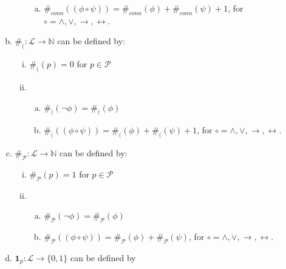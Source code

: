 \begin{enumerate}
\begin{enumerate}[(a)]
\begin{enumerate}[(i)]
\begin{enumerate}[(a)]
					\item $\#_{conn}((\phi\circ\psi))=\#_{conn}(\phi)+\#_{conn}(\psi)+1$, for $\circ=\land,\lor,\to,\leftrightarrow$.
		
					\end{enumerate}
		
			\end{enumerate}
		
		\item $\#_(:\mathcal{L}\to\mathbb{N}$ can be defined by:
	
			\begin{enumerate}[(i)]
		
				\item $\#_{(}(p)=0$ for $p\in\mathcal{P}$
		
				\item \begin{enumerate}[(a)]
		
						\item $\#_{(}(\neg\phi)=\#_{(}(\phi)$
			
						\item $\#_{(}((\phi\circ\psi))=\#_{(}(\phi)+\#_{(}(\psi)+1$, for $\circ=\land,\lor,\to,\leftrightarrow$.
		
					\end{enumerate}
				
			\end{enumerate}
		
	\item  $\#_{\mathcal{P}}:\mathcal{L}\to\mathbb{N}$ can be defined by:
		
		\begin{enumerate}[(i)]
	
		\item $\#_{\mathcal{P}}(p)=1$ for $p\in\mathcal{P}$
		
		\item \begin{enumerate}[(a)]
		
			\item $\#_{\mathcal{P}}(\neg\phi)=\#_{\mathcal{P}}(\phi)$
			
			\item $\#_{\mathcal{P}}((\phi\circ\psi))=\#_{\mathcal{P}}(\phi)+\#_{\mathcal{P}}(\psi)$, for $\circ=\land,\lor,\to,\leftrightarrow$.
		
		\end{enumerate}
		
		\end{enumerate}
		
		\item $\mathbf{1}_p:\mathcal{L}\to\{0,1\}$ can be defined by 
	

\end{enumerate}
\end{enumerate}
